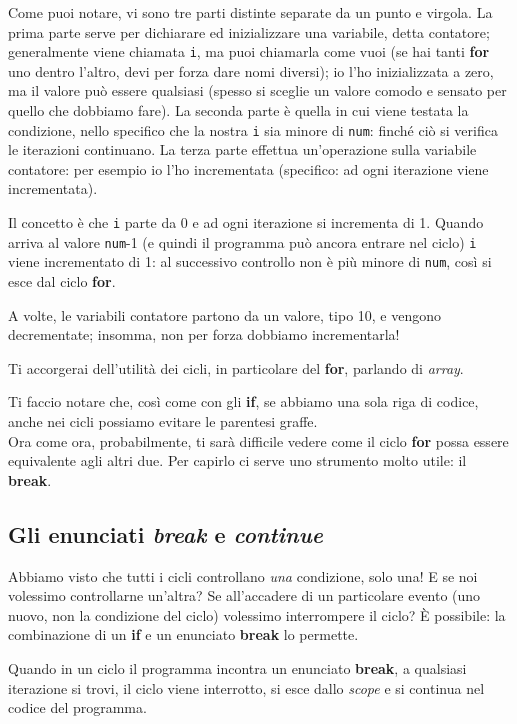 	Come puoi notare, vi sono tre parti distinte separate da un punto e virgola. La prima parte serve per dichiarare ed inizializzare una variabile, detta contatore; generalmente viene chiamata \verb|i|, ma puoi chiamarla come vuoi (se hai tanti \textbf{for} uno dentro l'altro, devi per forza dare nomi diversi); io l'ho inizializzata a zero, ma il valore può essere qualsiasi (spesso si sceglie un valore comodo e sensato per quello che dobbiamo fare). La seconda parte è quella in cui viene testata la condizione, nello specifico che la nostra \verb|i| sia minore di \verb|num|: finché ciò si verifica le iterazioni continuano. La terza parte effettua un'operazione sulla variabile contatore: per esempio io l'ho incrementata (specifico: ad ogni iterazione viene incrementata).
	
	Il concetto è che \verb|i| parte da 0 e ad ogni iterazione si incrementa di 1. Quando arriva al valore \verb|num|-1 (e quindi il programma può ancora entrare nel ciclo) \verb|i| viene incrementato di 1: al successivo controllo non è più minore di \verb|num|, così si esce dal ciclo \textbf{for}.
	
	A volte, le variabili contatore partono da un valore, tipo 10, e vengono decrementate; insomma, non per forza dobbiamo incrementarla! 
	
	Ti accorgerai dell'utilità dei cicli, in particolare del \textbf{for}, parlando di \emph{array}.
	
	Ti faccio notare che, così come con gli \textbf{if}, se abbiamo una sola riga di codice, anche nei cicli possiamo evitare le parentesi graffe.\\
	
	Ora come ora, probabilmente, ti sarà difficile vedere come il ciclo \textbf{for} possa essere equivalente agli altri due. Per capirlo ci serve uno strumento molto utile: il \textbf{break}.
	\subsection{Gli enunciati \emph{break} e \emph{continue}}
	Abbiamo visto che tutti i cicli controllano \emph{una} condizione, solo una! E se noi volessimo controllarne un'altra? Se all'accadere di un particolare evento (uno nuovo, non la condizione del ciclo) volessimo interrompere il ciclo?	\`E possibile: la combinazione di un \textbf{if} e un enunciato \textbf{break} lo permette.
	
	Quando in un ciclo il programma incontra un enunciato \textbf{break}, a qualsiasi iterazione si trovi, il ciclo viene interrotto, si esce dallo \emph{scope} e si continua nel codice del programma.
	
